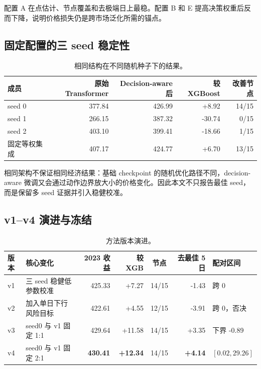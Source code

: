 \documentclass[UTF8,a4paper,11pt,fontset=fandol]{ctexart}
\newcommand{\best}[1]{\textbf{#1}}
\begin{document}
配置 A 在点估计、节点覆盖和去极端日上最稳。配置 B 和 E 提高决策权重后反而下降，说明价格损失仍是跨市场泛化所需的锚点。

\subsection{固定配置的三 seed 稳定性}

\begin{table}[H]
\centering
\caption{相同结构在不同随机种子下的结果。}
\label{tab:seeds}
\small
\begin{tabular}{lrrrr}
\toprule
成员 & 原始 Transformer & Decision-aware 后 & 较 XGBoost & 改善节点 \\
\midrule
seed 0 & 377.84 & 426.99 & +8.92 & 14/15 \\
seed 1 & 266.15 & 387.32 & -30.74 & 0/15 \\
seed 2 & 403.10 & 399.41 & -18.66 & 1/15 \\
固定等权集成 & 407.17 & 424.77 & +6.70 & 13/15 \\
\bottomrule
\end{tabular}
\end{table}

相同架构不保证相同经济结果：基础 checkpoint 的随机优化路径不同，decision-aware 微调又会通过动作边界放大小的价格变化。因此本文不只报告最佳 seed，而是保留多 seed 证据并引入稳健校准。

\subsection{v1--v4 演进与冻结}

\begin{table}[H]
\centering
\caption{方法版本演进。}
\label{tab:versions}
\footnotesize
\begin{tabularx}{\textwidth}{l Y r r c r Y}
\toprule
版本 & 核心变化 & 2023 收益 & 较 XGB & 节点 & 去最佳 5 日 & 配对区间 \\
\midrule
v1 & 三 seed 稳健低参数校准 & 425.33 & +7.27 & 14/15 & -1.43 & 跨 0 \\
v2 & 加入单日下行风险目标 & 422.61 & +4.55 & 12/15 & -3.91 & 跨 0，否决 \\
v3 & seed0 与 v1 固定 1:1 & 429.64 & +11.58 & 14/15 & +3.35 & 下界 -0.89 \\
v4 & seed0 与 v1 固定 2:1 & \best{430.41} & \best{+12.34} & 14/15 & \best{+4.14} & \best{$[0.02,29.26]$} \\
\bottomrule
\end{tabularx}
\end{table}
\end{document}
